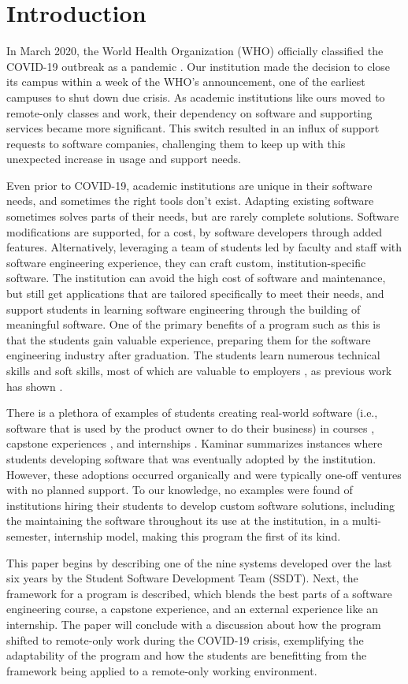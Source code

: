 \section{Introduction}

In March 2020, the World Health Organization (WHO) officially classified the COVID-19 outbreak as a pandemic \cite{}. Our institution made the decision to close its campus within a week of the WHO's announcement, one of the earliest campuses to shut down due crisis. As academic institutions like ours moved to remote-only classes and work, their dependency on software and supporting services became more significant. This switch resulted in an influx of support requests to software companies, challenging them to keep up with this unexpected increase in usage and support needs.

Even prior to COVID-19, academic institutions are unique in their software needs, and sometimes the right tools don't exist. Adapting existing software sometimes solves parts of their needs, but are rarely complete solutions. Software modifications are supported, for a cost, by software developers through added features. Alternatively, leveraging a team of students led by faculty and staff with software engineering experience, they can craft custom, institution-specific software. The institution can avoid the high cost of software and maintenance, but still get applications that are tailored specifically to meet their needs, and support students in learning software engineering through the building of meaningful software. One of the primary benefits of a program such as this is that the students gain valuable experience, preparing them for the software engineering industry after graduation. The students learn numerous technical skills and soft skills, most of which are valuable to employers \cite{lavy2013soft}, as previous work has shown \cite{heggen2018hiring}.

There is a plethora of examples of students creating real-world software (i.e., software that is used by the product owner to do their business) in courses \cite{tadayon2004software}, capstone experiences \cite{capstone}, and internships \cite{rochesterfirstundergradsoftwareteam}. Kaminar \cite{kaminer_2014} summarizes instances where students developing software that was eventually adopted by the institution. However, these adoptions occurred organically and were typically one-off ventures with no planned support. To our knowledge, no examples were found of institutions hiring their students to develop custom software solutions, including the maintaining the software throughout its use at the institution, in a multi-semester, internship model, making this program the first of its kind.

This paper begins by describing one of the nine systems developed over the last six years by the Student Software Development Team (SSDT). Next, the framework for a program is described, which blends the best parts of a software engineering course, a capstone experience, and an external experience like an internship. The paper will conclude with a discussion about how the program shifted to remote-only work during the COVID-19 crisis, exemplifying the adaptability of the program and how the students are benefitting from the framework being applied to a remote-only working environment.
